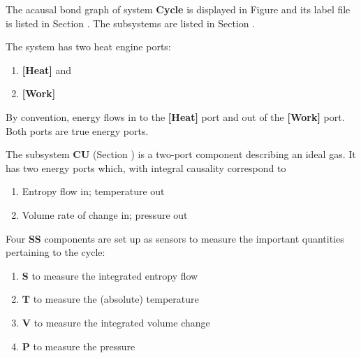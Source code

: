 
%

   The acausal bond graph of system \textbf{Cycle} is
   displayed in Figure  and its label
   file is listed in Section .
   The subsystems are listed in Section .

The system has two heat engine ports: 
\begin{enumerate}
\item \textbf{[Heat]} and
\item \textbf{[Work]}
\end{enumerate}
By convention, energy flows in to the \textbf{[Heat]} port and out of
the \textbf{[Work]} port. Both ports are true energy ports.


The subsystem \textbf{CU} (Section ) is a two-port
component describing an ideal gas. It has two energy ports which, with
integral causality correspond to
\begin{enumerate}
\item Entropy flow in; temperature out
\item Volume rate of change in; pressure out
\end{enumerate}

Four \textbf{SS} components are set up as sensors to measure the
important quantities pertaining to the cycle:
\begin{enumerate}
\item \textbf{S} to measure the integrated entropy flow
\item \textbf{T} to measure the (absolute) temperature
\item \textbf{V} to measure the integrated volume change
\item \textbf{P} to measure the pressure
\end{enumerate}

